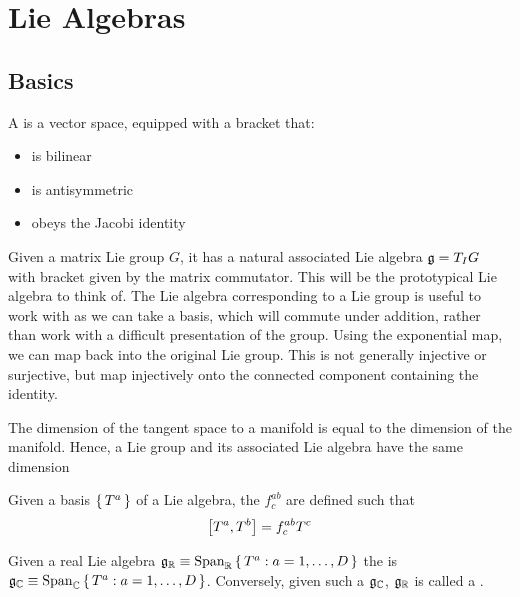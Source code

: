 \documentclass{article}
\begin{document}
\section{Lie Algebras}

\subsection{Basics}

\begin{definition} 

A  is a vector space, equipped with a bracket that:
\begin{itemize}
    \item is bilinear
    \item is antisymmetric
    \item obeys the Jacobi identity
\end{itemize}
\end{definition}

\begin{idea}
Given a matrix Lie group $G$, it has a natural associated Lie algebra $\mf{g}=T_{I}G$ with bracket given by the matrix commutator. This will be the prototypical Lie algebra to think of. The Lie algebra corresponding to a Lie group is useful to work with as we can take a basis, which will commute under addition, rather than work with a difficult presentation of the group.
Using the exponential map, we can map back into the original Lie group. This is not generally injective or surjective, but map injectively onto the connected component containing the identity. 
\end{idea}

\begin{fact}
The dimension of the tangent space to a manifold is equal to the dimension of the manifold. Hence, a Lie group and its associated Lie algebra have the same dimension
\end{fact}

\begin{definition}
Given a basis $\set{T^a}$ of a Lie algebra, the  $f^{ab}_c$ are defined such that 
\[
\comm[T^a]{T^b}=f^{ab}_c T^c
\]
\end{definition}

\begin{definition}
Given a  real Lie algebra $\mf{g}_\mathbb{R}\equiv\spn_{\mathbb{R}}\set{ T^a : a=1, \dots, D }$ the 
is $\mf{g}_\mathbb{C}\equiv\spn_{\mathbb{C}}\set{ T^a : a=1, \dots, D }$. Conversely, given such a $\mf{g}_\mathbb{C}$, $\mf{g}_\mathbb{R}$ is called a .  
\end{definition}
\end{document}
